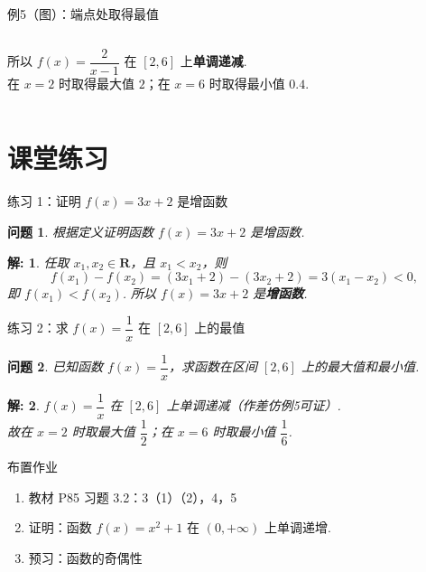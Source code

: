 \documentclass[aspectratio=169,13pt,t] {beamer}
\newtheorem{question}{问题}
\newtheorem*{solve}{解:}
\theoremstyle{definition}
\begin{document}
\begin{frame}{例5（图）：端点处取得最值}
	\begin{columns}
		\vspace{1em}
		\begin{summarybox-answer}
		所以 \(f(x)=\dfrac{2}{x-1}\) 在 \([2,6]\) 上\textbf{单调递减}.\\[4pt]
		在 \(x=2\) 时取得最大值 \(2\)；在 \(x=6\) 时取得最小值 \(0.4\).
		\end{summarybox-answer}
	\end{columns}
\end{frame}

\section{课堂练习}

\begin{frame}{练习 1：证明 \(f(x)=3x+2\) 是增函数}
	\begin{question}
	根据定义证明函数 \(f(x)=3x+2\) 是增函数.
	\end{question}
	\pause
	\begin{solve}
	任取 \(x_1,x_2\in\mathbf{R}\)，且 \(x_1<x_2\)，则
	\[
		f(x_1)-f(x_2)=(3x_1+2)-(3x_2+2)=3(x_1-x_2)<0,
	\]
	即 \(f(x_1)<f(x_2)\). 所以 \(f(x)=3x+2\) 是\textbf{增函数}.
	\end{solve}
\end{frame}

\begin{frame}{练习 2：求 \(f(x)=\dfrac{1}{x}\) 在 \([2,6]\) 上的最值}
	\begin{question}
	已知函数 \(f(x)=\dfrac{1}{x}\)，求函数在区间 \([2,6]\) 上的最大值和最小值.
	\end{question}
	\pause
	\begin{solve}
	\(f(x)=\dfrac{1}{x}\) 在 \([2,6]\) 上单调递减（作差仿例5可证）.\\
	故在 \(x=2\) 时取最大值 \(\dfrac{1}{2}\)；在 \(x=6\) 时取最小值 \(\dfrac{1}{6}\).
	\end{solve}
\end{frame}

\begin{frame}{布置作业}
	\begin{summarybox}[课后作业]
		\begin{enumerate}
			\item 教材 P85 习题 3.2：3（1）（2），4，5
			\item 证明：函数 \(f(x)=x^2+1\) 在 \((0,+\infty)\) 上单调递增.
			\item 预习：函数的奇偶性
		\end{enumerate}
	\end{summarybox}
\end{frame}
\end{document}
